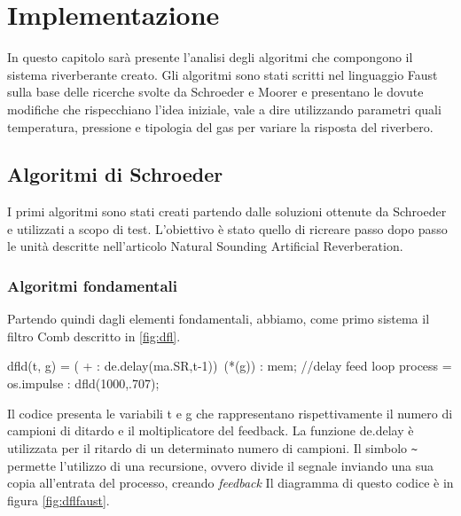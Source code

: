 
\chapter{Implementazione}
\label{chp:Implementazione}



In questo capitolo sarà presente l’analisi degli algoritmi che compongono il sistema riverberante creato. Gli algoritmi sono stati scritti nel linguaggio Faust sulla base delle ricerche svolte da Schroeder e Moorer e presentano le dovute modifiche che rispecchiano l’idea iniziale, vale a dire utilizzando parametri quali temperatura, pressione e tipologia del gas per variare la risposta del riverbero.

\section{Algoritmi di Schroeder}

I primi algoritmi sono stati creati partendo dalle soluzioni ottenute da Schroeder e utilizzati a scopo di test. L’obiettivo è stato quello di ricreare passo dopo passo le unità descritte nell’articolo Natural Sounding Artificial Reverberation.

\subsection{Algoritmi fondamentali}

Partendo quindi dagli elementi fondamentali, abbiamo, come primo sistema il filtro Comb descritto in \ref{fig:dfl}.
\begin{code}
dfld(t, g) = ( + : de.delay(ma.SR,t-1))~(*(g)) : mem; //delay feed loop
process = os.impulse : dfld(1000,.707);
\end{code}

Il codice presenta le variabili t e g che rappresentano rispettivamente il numero di campioni di ditardo e il moltiplicatore del feedback.
La funzione de.delay è utilizzata per il ritardo di un determinato numero di campioni.
Il simbolo \verb!~! permette l'utilizzo di una recursione, ovvero divide il segnale inviando una sua copia all'entrata del processo, creando \emph{feedback}
Il diagramma di questo codice è in figura \ref{fig:dflfaust}.

\bigskip

